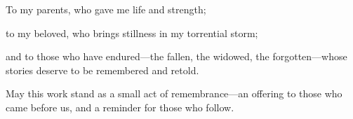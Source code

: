 \documentclass[../1_thesis]{subfiles}
\begin{document}

\begin{acknowledgements}
To my parents, who gave me life and strength;

to my beloved, who brings stillness in my torrential storm;

and to those who have endured---the fallen, the widowed, the forgotten---whose stories deserve to be remembered and retold.  

May this work stand as a small act of remembrance---an offering to those who came before us, and a reminder for those who follow.
\end{acknowledgements}
\end{document}
